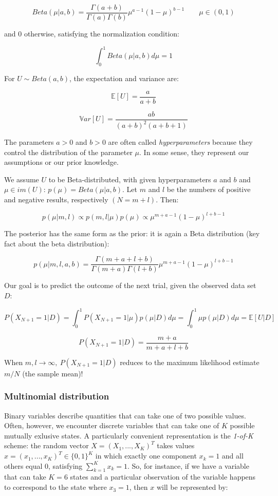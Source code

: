 \documentclass{article}
\begin{document}
\[Beta(\mu | a, b) = \frac{\Gamma (a+b)}{\Gamma(a) \Gamma(b)}\mu^{a-1}(1-\mu)^{b-1} \qquad \mu \in (0, 1)\]

and 0 otherwise, satisfying the normalization condition:

\[\int_0^1 Beta(\mu | a, b) d\mu = 1\]

For \(U \sim Beta(a, b)\), the expectation and variance are:

\[\mathbb{E}[U] = \frac{a}{a+b}\]

\[\mathbb{V}ar[U] = \frac{ab}{(a+b)^2 (a+b+1)}\]

The parameters \(a > 0\) and \(b > 0\) are often called
\emph{hyperparameters} because they control the distribution of the
parameter \(\mu\). In some sense, they represent our assumptions or our
prior knowledge.

We assume \(U\) to be Beta-distributed, with given hyperparameters \(a\)
and \(b\) and \(\mu \in im(U)\): \(p(\mu) = Beta(\mu | a, b)\). Let
\(m\) and \(l\) be the numbers of positive and negative results,
respectively \((N = m + l)\). Then:

\[p(\mu | m, l) \propto p(m, l | \mu ) p(\mu) \propto \mu^{m + a - 1} (1-\mu)^{l+b-1}\]

The posterior has the same form as the prior: it is again a Beta
distribution (key fact about the beta distribution):

\[p(\mu | m, l, a, b) = \frac{\Gamma (m+a+l+b)}{\Gamma (m+a) \Gamma (l+b)}\mu^{m+a-1} (1-\mu)^{l+b-1}\]

Our goal is to predict the outcome of the next trial, given the observed
data set \(D\):

\[P(X_{N+1}=1 | D) = \int_0^1 P(X_{N+1}=1 | \mu) p(\mu | D) d\mu = \int_0^1 \mu p(\mu | D)
d\mu = \mathbb{E}[U | D]\]

\[P(X_{N+1}=1 | D) = \frac{m + a}{m + a + l + b}\]

When \(m, l \rightarrow \infty,\ P(X_{N+1}=1 | D)\) reduces to the
maximum likelihood estimate \(m/N\) (the sample mean)!

\subsubsection{Multinomial distribution}\label{multinomial-distribution}

Binary variables describe quantities that can take one of two possible
values. Often, however, we encounter discrete variables that can take
one of \(K\) possible mutually exlusive states. A particularly
convenient representation is the \emph{1-of-K} scheme: the random vector
\(X = (X_1, ..., X_K)^T\) takes values \(x =
(x_1, ..., x_K)^T \in \{0, 1\}^K\) in which exactly one component
\(x_k = 1\) and all others equal \(0\), satisfying
\(\sum_{k=1}^K x_k = 1\). So, for instance, if we have a variable that
can take \(K=6\) states and a particular observation of the variable
happens to correspond to the state where \(x_3 = 1\), then \(x\) will be
represented by:
\end{document}

